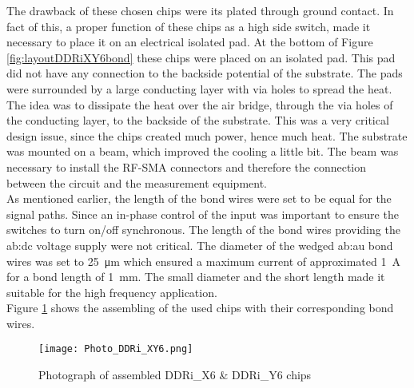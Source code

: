 The drawback of these chosen chips were its plated through ground contact. 
In fact of this, a proper function of these chips as a high side switch, made it necessary to place it on an electrical isolated pad.
At the bottom of Figure \ref{fig:layoutDDRiXY6bond} these chips were placed on an isolated pad.
This pad did not have any connection to the backside potential of the substrate.
The pads were surrounded by a large conducting layer with via holes to spread the heat.
The idea was to dissipate the heat over the air bridge, through the via holes of the conducting layer, to the backside of the substrate.
This was a very critical design issue, since the chips created much power, hence much heat.
The substrate was mounted on a beam, which improved the cooling a little bit.
The beam was necessary to install the RF-SMA connectors and therefore the connection between the circuit and the measurement equipment.\\
As mentioned earlier, the length of the bond wires were set to be equal for the signal paths.
Since an in-phase control of the input was important to ensure the switches to turn on/off synchronous.
The length of the bond wires providing the \gls{ab:dc} voltage supply were not critical.
The diameter of the wedged \gls{ab:au} bond wires was set to \SI{25}{\micro \metre} which ensured a maximum current of approximated \SI{1}{\ampere} for a bond length of \SI{1}{\milli \metre}.
The small diameter and the short length made it suitable for the high frequency application.\\
Figure \ref{fig:photoDDRiXY6bond} shows the assembling of the used chips with their corresponding bond wires.

\begin{figure}[htb!] %
	\centering
  \texttt{[image: Photo\_DDRi\_XY6.png]}
	\caption{Photograph of assembled DDRi\_X6 \& DDRi\_Y6 chips}
	\label{fig:photoDDRiXY6bond}
\end{figure}


\newpage

